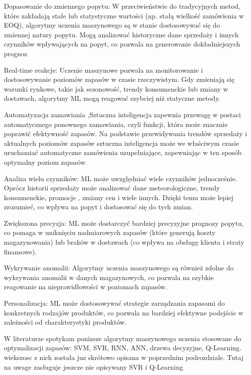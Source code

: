Dopasowanie do zmiennego popytu: W przeciwieństwie do tradycyjnych metod, które zakładają stałe lub statystyczne wartości (np. stałą wielkość zamówienia w EOQ), algorytmy uczenia maszynowego są w stanie dostosowywać się do zmiennej natury popytu. Mogą analizować historyczne dane sprzedaży i innych czynników wpływających na popyt, co pozwala na generowanie dokładniejszych prognoz

Real-time reakcje: Uczenie maszynowe pozwala na monitorowanie i dostosowywanie poziomów zapasów w czasie rzeczywistym. Gdy zmieniają się warunki rynkowe, takie jak sezonowość, trendy konsumenckie lub zmiany w dostawach, algorytmy ML mogą reagować szybciej niż statyczne metody.

Automatyzacja zamawiania ,Sztuczna inteligencja zapewnia przewagę w postaci automatycznego ponownego zamawiania, czyli funkcji, która może znacznie poprawić efektywność zapasów. Na podstawie przewidywania trendów sprzedaży i aktualnych poziomów zapasów sztuczna inteligencja może we właściwym czasie uruchamiać automatyczne zamówienia uzupełniające, zapewniając w ten sposób optymalny poziom zapasów.

Analiza wielu czynników: ML może uwzględniać wiele czynników jednocześnie. Oprócz historii sprzedaży może analizować dane meteorologiczne, trendy konsumenckie, promocje , zmiany cen i wiele innych. Dzięki temu może lepiej zrozumieć, co wpływa na popyt i dostosować się do tych zmian.

Zwiększona precyzja: ML może dostarczyć bardziej precyzyjne prognozy popytu, co pomaga w uniknięciu nadmiarowych zapasów (które generują koszty magazynowania) lub braków w dostawach (co wpływa na obsługę klienta i straty finansowe).

Wykrywanie anomalii: Algorytmy uczenia maszynowego są również zdolne do wykrywania anomalii w danych magazynowych, co pozwala na szybkie reagowanie na nieprawidłowości w poziomach zapasów.

Personalizacja: ML może dostosowywać strategie zarządzania zapasami do konkretnych rodzajów produktów, co pozwala na bardziej efektywne podejście w zależności od charakterystyki produktów.
\cite{linn2023}\cite{cdp2023}\cite{Matti2023}\cite{Had2023}

W literaturze spotykam ponizsze algorytmy maszynowego uczenia stosowane do optymalizacji zapasów:
SVM, SVR, RNN, ANN, drzewa decyzyjne, Q-Learning. wiekszosc z nich została juz skrótowo opisana w poprzednim podrozdziale. Tutaj na uwage zasługuje jeszcze nie opisywany SVR i Q-Learning

